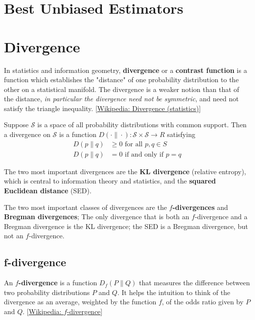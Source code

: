 \section{Best Unbiased Estimators}


\section{Divergence}
In statistics and information geometry, \textbf{divergence} or a \textbf{contrast function} is a function
which establishes the "distance" of one probability distribution to the other on a statistical manifold.
The divergence is a weaker notion than that of the distance, \textit{in particular the divergence need not be symmetric},
and need not satisfy the triangle inequality. [\href{https://en.wikipedia.org/wiki/Divergence_(statistics)}{Wikipedia: Divergence (statistics)}]

Suppose $\mathcal{S}$ is a space of all probability distributions with common support.
Then a divergence on $\mathcal{S}$ is a function $D(\cdot\|\cdot): \mathcal{S} \times \mathcal{S} \rightarrow R$ satisfying
\begin{align}
    D(p\|q) &\geq 0 \text{ for all }p, q \in S \\
    D(p\|q) &= 0 \text{ if and only if }p = q
\end{align}

The two most important divergences are the \textbf{KL divergence} (relative entropy), which is central to information theory
and statistics, and the \textbf{squared Euclidean distance} (SED).

The two most important classes of divergences are the \textbf{$f$-divergences} and \textbf{Bregman divergences};
The only divergence that is both an $f$-divergence and a Bregman divergence is the KL divergence;
the SED is a Bregman divergence, but not an $f$-divergence.

\subsection{f-divergence}
An \textbf{$f$-divergence} is a function $D_f(P\|Q)$ that measures the difference between two probability
distributions $P$ and $Q$. It helps the intuition to think of the divergence as an average, weighted by the
function $f$, of the odds ratio given by $P$ and $Q$. [\href{https://en.wikipedia.org/wiki/F-divergence}{Wikipedia: $f$-divergence}]

